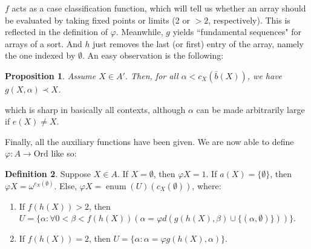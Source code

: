 \documentclass{article}
\theoremstyle{definition}
\newtheorem{definition}{Definition}[section]
\theoremstyle{plain}
\theoremstyle{plain}
\theoremstyle{plain}
\newtheorem{proposition}[definition]{Proposition}
\theoremstyle{plain}
\theoremstyle{remark}
\theoremstyle{remark}
\theoremstyle{remark}
\theoremstyle{plain}
\theoremstyle{plain}
\begin{document}
$f$ acts as a case classification function, which will tell us whether an array should be evaluated by taking fixed points or limits (2 or $> 2$, respectively). This is reflected in the definition of $\varphi$. Meanwhile, $g$ yields ``fundamental sequences" for arrays of a sort. And $h$ just removes the last (or first) entry of the array, namely the one indexed by $\emptyset$. An easy observation is the following:

\begin{proposition}
Assume $X \in A'$. Then, for all $\alpha < c_X(\bar{b}(X))$, we have $g(X, \alpha) \prec X$.
\end{proposition}

which is sharp in basically all contexts, although $\alpha$ can be made arbitrarily large if $e(X) \neq X$.

Finally, all the auxiliary functions have been given. We are now able to define $\varphi: A \to \mathrm{Ord}$ like so:

\begin{definition}
Suppose $X \in A$. If $X = \emptyset$, then $\varphi X = 1$. If $a(X) = \{\emptyset\}$, then $\varphi X = \omega^{c_X(\emptyset)}$. Else, $\varphi X = \operatorname{enum}(U)(c_X(\emptyset))$, where:

\begin{enumerate}
    \item If $f(h(X)) > 2$, then $U = \{\alpha: \forall 0 < \beta < f(h(X)) (\alpha = \varphi d(g(h(X), \beta) \cup \{(\alpha, \emptyset)\}))\}$.
    \item If $f(h(X)) = 2$, then $U = \{\alpha: \alpha = \varphi g(h(X), \alpha)\}$.
\end{enumerate}
\end{definition}
\end{document}
